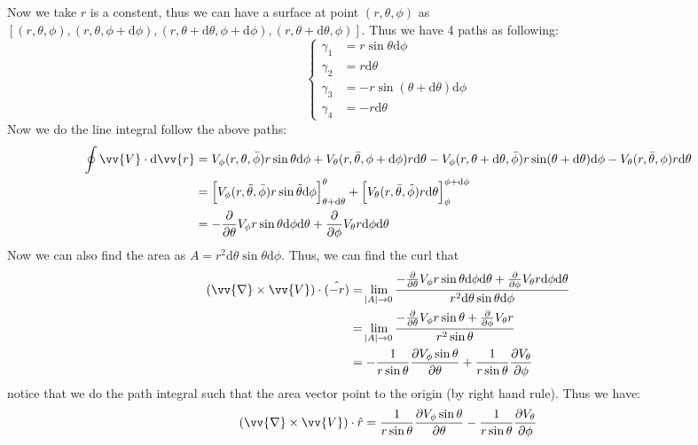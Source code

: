 \documentclass{article}
\newcommand{\de}{\mathrm{d}}
\begin{document}
\begin{enumerate}
\begin{enumerate}
        Now we take $r$ is a constent, thus we can have a surface at point $(r,\theta,\phi)$ as $[(r,\theta,\phi), (r,\theta,\phi+ \de \phi), (r,\theta + \de \theta,\phi + \de \phi), (r,\theta + \de \theta, \phi)]$. Thus we have 4 paths as following:
        \[
        \left\{
        \begin{aligned}
        \gamma_1 &= r \sin\theta \de \phi\\
        \gamma_2 &= r\de \theta\\
        \gamma_3 &= -r \sin(\theta + \de \theta)\de \phi\\
        \gamma_4 &= -r\de \theta
        \end{aligned}
        \right.
        \]
        Now we do the line integral follow the above paths:
        \begin{align*}
            \oint \vv{V}\cdot \de \vv{r} &= 
            V_\phi(r,\theta,\bar{\phi})r \sin\theta \de \phi + 
            V_\theta(r,\bar{\theta},\phi + \de \phi)r\de \theta 
            - V_\phi(r, \theta + \de \theta, \bar{\phi}) r \sin(\theta + \de \theta)\de \phi 
            - V_\theta(r,\bar{\theta},\phi) r\de \theta \\
            &= \left[V_\phi(r,\tilde{\theta},\bar{\phi})r\sin\tilde{\theta}\de\phi \right]_{\theta + \de \theta}^\theta + 
            \left[V_\theta(r,\bar{\theta},\tilde{\phi})r\de\theta\right]_\phi^{\phi+\de \phi} \\
            &= -\frac{\partial}{\partial \theta}V_\phi r \sin\theta \de\phi\de\theta + \frac{\partial}{\partial\phi} V_\theta r \de \phi \de \theta
        \end{align*}
        Now we can also find the area as $A = r^2\de\theta \sin\theta\de \phi$. Thus, we can find the curl that 
        \begin{align*}
            (\vv{\nabla} \times \vv{V})\cdot \hat{(-r)} &= \lim_{\abs{A}\rightarrow 0} \frac{-\frac{\partial}{\partial \theta}V_\phi r \sin\theta \de\phi\de\theta + \frac{\partial}{\partial\phi} V_\theta r \de \phi \de \theta}{r^2\de\theta \sin\theta\de \phi}\\
            &= \lim_{\abs{A}\rightarrow 0} \frac{-\frac{\partial}{\partial \theta}V_\phi r \sin\theta  + \frac{\partial}{\partial\phi} V_\theta r }{r^2 \sin\theta} \\
            &= -\frac{1}{r\sin\theta}\frac{\partial V_\phi \sin\theta}{\partial\theta} + \frac{1}{r\sin\theta}\frac{\partial V_\theta}{\partial \phi}
        \end{align*}
        notice that we do the path integral such that the area vector point to the origin (by right hand rule). Thus we have:
        \[
            (\vv{\nabla} \times \vv{V})\cdot \hat{r} = \frac{1}{r\sin\theta}\frac{\partial V_\phi \sin\theta}{\partial\theta} - \frac{1}{r\sin\theta}\frac{\partial V_\theta}{\partial \phi}
        \]


\end{enumerate}
\end{enumerate}
\end{document}
